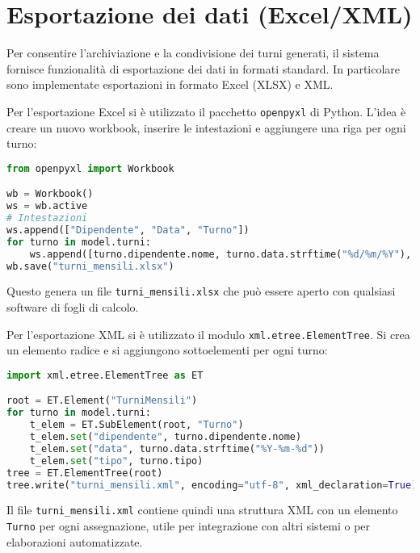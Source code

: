 \documentclass[a4paper,12pt]{report}
\begin{document}
\chapter{Esportazione dei dati (Excel/XML)}
\label{cap:esportazione}
Per consentire l'archiviazione e la condivisione dei turni generati, il sistema fornisce funzionalit\`a di esportazione dei dati in formati standard. In particolare sono implementate esportazioni in formato Excel (XLSX) e XML.

Per l'esportazione Excel si \`e utilizzato il pacchetto \texttt{openpyxl} di Python. L'idea \`e creare un nuovo workbook, inserire le intestazioni e aggiungere una riga per ogni turno:
\begin{lstlisting}[language=Python]
from openpyxl import Workbook

wb = Workbook()
ws = wb.active
# Intestazioni
ws.append(["Dipendente", "Data", "Turno"])
for turno in model.turni:
    ws.append([turno.dipendente.nome, turno.data.strftime("%d/%m/%Y"), turno.tipo])
wb.save("turni_mensili.xlsx")
\end{lstlisting}
Questo genera un file \texttt{turni_mensili.xlsx} che pu\`o essere aperto con qualsiasi software di fogli di calcolo.

Per l'esportazione XML si \`e utilizzato il modulo \texttt{xml.etree.ElementTree}. Si crea un elemento radice e si aggiungono sottoelementi per ogni turno:
\begin{lstlisting}[language=Python]
import xml.etree.ElementTree as ET

root = ET.Element("TurniMensili")
for turno in model.turni:
    t_elem = ET.SubElement(root, "Turno")
    t_elem.set("dipendente", turno.dipendente.nome)
    t_elem.set("data", turno.data.strftime("%Y-%m-%d"))
    t_elem.set("tipo", turno.tipo)
tree = ET.ElementTree(root)
tree.write("turni_mensili.xml", encoding="utf-8", xml_declaration=True)
\end{lstlisting}
Il file \texttt{turni_mensili.xml} contiene quindi una struttura XML con un elemento \texttt{Turno} per ogni assegnazione, utile per integrazione con altri sistemi o per elaborazioni automatizzate.
\end{document}
